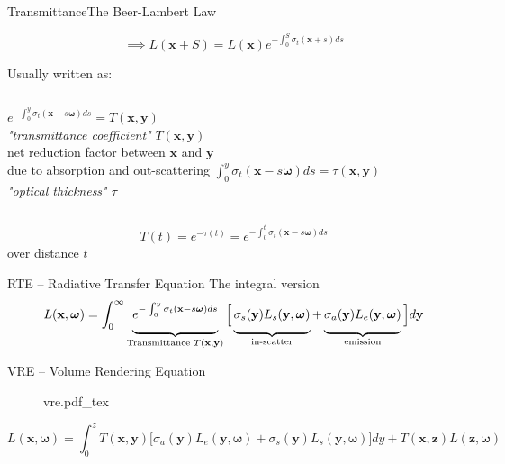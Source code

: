\documentclass[
  english,            %
  aspectratio=169,    %
]{tumbeamer}
\newcommand\bx[0]{\textbf{x}}
\newcommand\by[0]{\textbf{y}}
\newcommand\bomega[0]{\boldsymbol{\omega}}
\newcommand*\mystrut[1]{\vrule width0pt height0pt depth#1\relax}
\newcommand{\incfig}[1]{%
    \def\svgwidth{\columnwidth}
    {#1.pdf_tex}
}
\begin{document}
\begin{frame}{Transmittance}{The Beer-Lambert Law}
\begin{figure}[ht]
$$ \implies L(\bx + S) = L(\bx)e^{-\int_0^S \sigma_t(\bx+s)ds} $$
\end{figure}

Usually written as:\\
\begin{columns}[t, onlytextwidth]
    $e^{-\int_0^y \sigma_t(\bx-s\bomega)ds} = T(\bx, \by)$
    \\
    \textit{"transmittance coefficient"} $T(\bx, \by)$\\
    net reduction factor between $\bx$ and $\by$ \\due to absorption and
    out-scattering
    $\int_0^y \sigma_t(\bx-s\bomega)ds = \tau(\bx,\by)$\\
    \textit{"optical thickness" $\tau$}
\end{columns}

\vfill
$$ T(t) = e^{-\tau(t)} = e^{-\int_0^t \sigma_t(\bx-s\bomega)ds} $$
    \centering over distance $t$

\end{frame}

\begin{frame}{RTE -- Radiative Transfer Equation}
    {The integral version}
    \vfill
    \vfill
    \begin{equation}
        L(\bx, \bomega) = \int_0^\infty 
        \underbrace{\mystrut{2ex}
            e^{-\int_0^y{\sigma_t(\bx-s\bomega)}ds}
        }_{\text{Transmittance } T(\bx, \by)}
        \Big[
            \underbrace{\mystrut{2ex}
                \sigma_s(\by)L_s(\by, \bomega)
            }_{\text{in-scatter}}
            + 
            \underbrace{\mystrut{2ex}
                \sigma_a(\by)L_e(\by, \bomega)
            }_{\text{emission}}
        \Big]
        d\by
    \end{equation}
    \vfill
\end{frame}

\begin{frame}{VRE -- Volume Rendering Equation}
    \begin{figure}[ht]
        \centering
        \incfig{vre}
        \label{fig:vre}
    \end{figure}
    \begin{equation}
    L(\bx, \bomega) = \int_{0}^{z} 
        T(\bx, \by)
        \big[ 
            \sigma_a(\by)L_e(\by, \bomega) + 
            \sigma_s(\by)L_s(\by, \bomega)
        \big] dy
        + 
        T(\bx, \textbf{z})L(\textbf{z},\bomega)
    \end{equation}
\end{frame}
\end{document}
